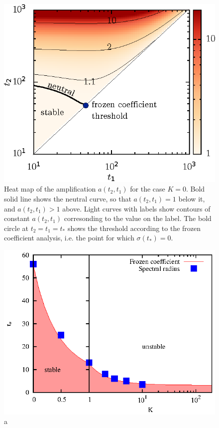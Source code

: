 \documentclass[letterpaper,10pt,prl,twocolumn,aps,reprint,superscriptaddress]{revtex4-1}
\newcommand{\tc}{t_*}
\begin{document}
\begin{figure}
 \centering
 \includegraphics{./Figures/Message}
 \caption{Heat map of the amplification $a(t_2, t_1)$ for the case $K=0$. Bold solid line shows the neutral curve, so that $a(t_2, t_1)=1$ below it, and $a(t_2,t_1)>1$ above. Light curves with labels show contours of constant $a(t_2,t_1)$ corresonding to the value on the label. The bold circle at $t_2 = t_1 = \tc$ shows the threshold according to the frozen coefficient analysis, i.e. the point for which $\sigma(\tc)=0$.}
 \label{fig:Message}
\end{figure}


\begin{figure}
 \centering
 \includegraphics{./Figures/Frozen.eps}
 \caption{a}
 \label{fig:Frozen}
\end{figure}
\end{document}
